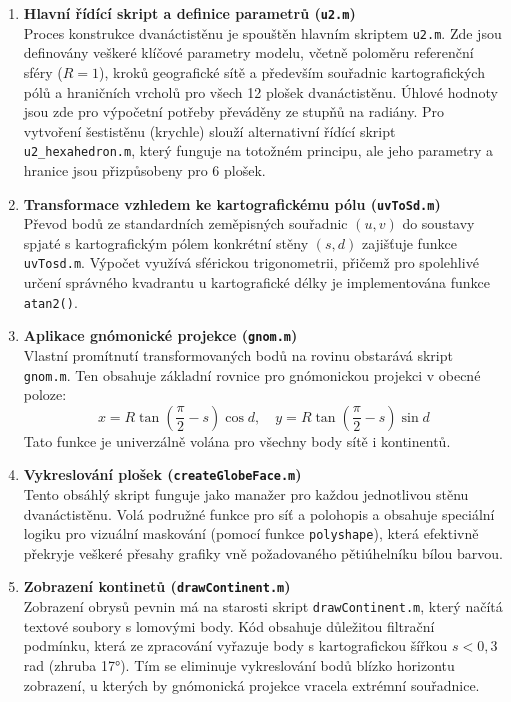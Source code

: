 \documentclass[12pt, a4paper]{article}
\begin{document}
\begin{enumerate}
    \item \textbf{Hlavní řídící skript a definice parametrů (\texttt{u2.m})}\\[0.2cm] 
   Proces konstrukce dvanáctistěnu je spouštěn hlavním skriptem \texttt{u2.m}. Zde jsou definovány veškeré klíčové parametry modelu, včetně poloměru referenční sféry ($R = 1$), kroků geografické sítě a především souřadnic kartografických pólů a hraničních vrcholů pro všech 12 plošek dvanáctistěnu. Úhlové hodnoty jsou zde pro výpočetní potřeby převáděny ze stupňů na radiány. Pro vytvoření šestistěnu (krychle) slouží alternativní řídící skript \texttt{u2\_hexahedron.m}, který funguje na totožném principu, ale jeho parametry a hranice jsou přizpůsobeny pro 6 plošek.

    \item \textbf{Transformace vzhledem ke kartografickému pólu (\texttt{uvToSd.m})}\\[0.2cm]
    Převod bodů ze standardních zeměpisných souřadnic $(u, v)$ do soustavy spjaté s kartografickým pólem konkrétní stěny $(s, d)$ zajišťuje funkce \texttt{uvTosd.m}. Výpočet využívá sférickou trigonometrii, přičemž pro spolehlivé určení správného kvadrantu u kartografické délky je implementována funkce \texttt{atan2()}.

    \item \textbf{Aplikace gnómonické projekce (\texttt{gnom.m})}\\[0.2cm]
    Vlastní promítnutí transformovaných bodů na rovinu obstarává skript \texttt{gnom.m}. Ten obsahuje základní rovnice pro gnómonickou projekci v obecné poloze:
    $$ x = R \tan\left(\frac{\pi}{2} - s\right) \cos d, \quad y = R \tan\left(\frac{\pi}{2} - s\right) \sin d $$
    Tato funkce je univerzálně volána pro všechny body sítě i kontinentů.

    \item \textbf{Vykreslování plošek (\texttt{createGlobeFace.m})}\\[0.2cm]
    Tento obsáhlý skript funguje jako manažer pro každou jednotlivou stěnu dvanáctistěnu. Volá podružné funkce pro síť a polohopis a obsahuje speciální logiku pro vizuální maskování (pomocí funkce \texttt{polyshape}), která efektivně překryje veškeré přesahy grafiky vně požadovaného pětiúhelníku bílou barvou.

    \item \textbf{Zobrazení kontinetů (\texttt{drawContinent.m})}\\[0.2cm]
    Zobrazení obrysů pevnin má na starosti skript \texttt{drawContinent.m}, který načítá textové soubory s lomovými body. Kód obsahuje důležitou filtrační podmínku, která ze zpracování vyřazuje body s kartografickou šířkou $s < 0,3$ rad (zhruba 17°). Tím se eliminuje vykreslování bodů blízko horizontu zobrazení, u kterých by gnómonická projekce vracela extrémní souřadnice.


\end{enumerate}
\end{document}

